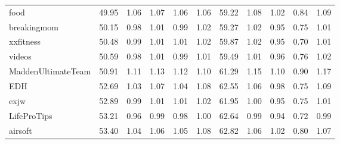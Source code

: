 \begin{tabular}{lrrrrrrrrrr}
food                &          49.95 &                1.06 &                1.07 &                1.06 &                1.06 &                 59.22 &                       1.08 &                       1.02 &                       0.84 &                       1.09 \\
breakingmom         &          50.15 &                0.98 &                1.01 &                0.99 &                1.02 &                 59.27 &                       1.02 &                       0.95 &                       0.75 &                       1.01 \\
xxfitness           &          50.48 &                0.99 &                1.01 &                1.01 &                1.02 &                 59.87 &                       1.02 &                       0.95 &                       0.70 &                       1.01 \\
videos              &          50.59 &                0.98 &                1.01 &                0.99 &                1.01 &                 59.49 &                       1.01 &                       0.96 &                       0.76 &                       1.02 \\
MaddenUltimateTeam  &          50.91 &                1.11 &                1.13 &                1.12 &                1.10 &                 61.29 &                       1.15 &                       1.10 &                       0.90 &                       1.17 \\
EDH                 &          52.69 &                1.03 &                1.07 &                1.04 &                1.08 &                 62.55 &                       1.06 &                       0.98 &                       0.75 &                       1.09 \\
exjw                &          52.89 &                0.99 &                1.01 &                1.01 &                1.02 &                 61.95 &                       1.00 &                       0.95 &                       0.75 &                       1.01 \\
LifeProTips         &          53.21 &                0.96 &                0.99 &                0.98 &                1.00 &                 62.64 &                       0.99 &                       0.94 &                       0.72 &                       0.99 \\
airsoft             &          53.40 &                1.04 &                1.06 &                1.05 &                1.08 &                 62.82 &                       1.06 &                       1.02 &                       0.80 &                       1.07 \\

\end{tabular}
